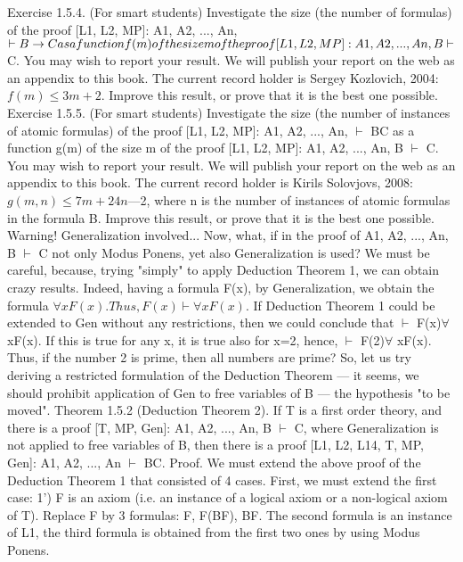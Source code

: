 Exercise 1.5.4. (For smart students) Investigate the size (the number of formulas) of the proof [L1, L2,
MP]: A1, A2, ..., An, \(\vdash B\rightarrow C as a function f(m) of the size m of the proof [L1, L2, MP]: A1, A2, ..., An, B \vdash\)
C. You may wish to report your result. We will publish your report on the web as an appendix to this
book. The current record holder is Sergey Kozlovich, 2004: \(f(m) \leq 3m+2\). Improve this result, or prove
that it is the best one possible.
Exercise 1.5.5. (For smart students) Investigate the size (the number of instances of atomic formulas) of
the proof [L1, L2, MP]: A1, A2, ..., An, \(\vdash\) B\IMPLIES C as a function g(m) of the size m of the proof [L1, L2, MP]:
A1, A2, ..., An, B \(\vdash\) C. You may wish to report your result. We will publish your report on the web as an
appendix to this book. The current record holder is Kirils Solovjovs, 2008: \(g(m, n) \leq 7m+24n\)---2, where n
is the number of instances of atomic formulas in the formula B. Improve this result, or prove that it is the
best one possible.
Warning! Generalization involved...
Now, what, if in the proof of A1, A2, ..., An, B \(\vdash\) C not only Modus Ponens, yet also Generalization is
used?
We must be careful, because, trying "simply" to apply Deduction Theorem 1, we can obtain crazy results.
Indeed, having a formula F(x), by Generalization, we obtain the formula \(\forall xF(x). Thus, F(x) \vdash \forall xF(x)\). If
Deduction Theorem 1 could be extended to Gen without any restrictions, then we could conclude that \(\vdash\)
F(x)\IMPLIES \(\forall\) xF(x). If this is true for any x, it is true also for x=2, hence, \(\vdash\) F(2)\IMPLIES \(\forall\) xF(x). Thus, if the number
2 is prime, then all numbers are prime?
So, let us try deriving a restricted formulation of the Deduction Theorem --- it seems, we should prohibit
application of Gen to free variables of B --- the hypothesis "to be moved".
Theorem 1.5.2 (Deduction Theorem 2). If T is a first order theory, and there is a proof [T, MP, Gen]: A1,
A2, ..., An, B \(\vdash\) C, where Generalization is not applied to free variables of B, then there is a proof [L1, L2,
L14, T, MP, Gen]: A1, A2, ..., An \(\vdash\) B\IMPLIES C.
Proof. We must extend the above proof of the Deduction Theorem 1 that consisted of 4 cases. First, we
must extend the first case:
1') F is an axiom (i.e. an instance of a logical axiom or a non-logical axiom of T). Replace F by 3
formulas: F, F\IMPLIES (B\IMPLIES F), B\IMPLIES F. The second formula is an instance of L1, the third formula is obtained
from the first two ones by using Modus Ponens.
